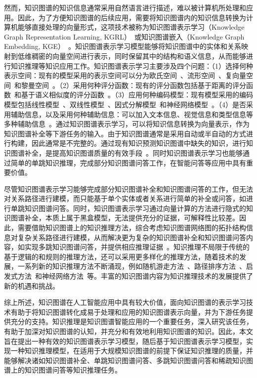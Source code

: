\documentclass[algorithmlist, AutoFakeBold, AutoFakeSlant, figurelist, tablelist, nomlist, engineering]{seuthesix}
\begin{document}
然而，知识图谱的知识信息通常采用自然语言进行描述，难以被计算机所处理和应用。因此，为了方便知识图谱的后续应用，需要将知识图谱内的知识信息转换为计算机能够直接处理的向量形式，这项技术被称为知识图谱表示学习（Knowledge Graph Representation Learning, KGRL）~\cite{chen2022rlpath}或知识图谱嵌入（Knowledge Graph Embedding, KGE）~\cite{wang2021transet}。知识图谱表示学习模型能够将知识图谱中的实体和关系映射到低维稠密的向量空间进行表示，同时保留其中的结构和语义信息，从而能够进行知识推理等知识应用工作。知识图谱表示学习主要涉及四个问题：（1）选择何种表示空间：现有的模型采用的表示空间可以分为欧氏空间~\cite{lu2022dense}、流形空间~\cite{ebisu2018toruse}、复向量空间~\cite{trouillon2016complex}和黎曼空间~\cite{pan2021hyperbolic}。（2）采用何种评分函数：现有的评分函数包括基于距离的评分函数~\cite{sachan2020knowledge}和基于语义相似度的评分函数~\cite{xiao2017ssp}。（3）应用何种编码模型：现有模型采用的编码模型包括线性模型~\cite{peng2020lineare}、双线性模型~\cite{pan2021hyperbolic}、因式分解模型~\cite{ji2015knowledge}和神经网络模型~\cite{jiang2021kernel}。（4）是否采用辅助信息，以及采用何种辅助信息：可以加入文本信息、视觉信息和类型信息等多种辅助信息~\cite{wang2017knowledge}。通过知识图谱表示学习，可以将知识信息转换为向量表示，作为知识图谱补全等下游任务的输入。由于知识图谱通常是采用自动或半自动的方式进行构建，因此通常是不完整的。通过现有知识预测知识图谱中缺失的知识，进行知识图谱补全，是提高知识图谱质量的有效手段~\cite{vu2019capsule}。同时知识图谱表示学习也能够通过简单的单跳知识推理，完成部分知识图谱问答工作，在智能问答等应用中具有重要价值。

尽管知识图谱表示学习能够完成部分知识图谱补全和知识图谱问答的工作，但无法对关系路径进行建模，而只能基于单个实体或者关系进行简单的补全或问答，如进行单跳知识图谱问答。同时，知识图谱表示学习通过向量计算的方法进行隐式的知识图谱补全，本质上属于黑盒模型，无法提供充分的证据，可解释性比较差。因此，需要借助知识图谱上的知识推理方法，综合考虑知识图谱网络图的拓扑结构信息对复杂关系路径进行建模，从而解决更为复杂的知识图谱补全和知识图谱问答内容，如实现多跳知识图谱问答，并提供相应推理证据~\cite{chen2020review}。知识推理不局限于传统的基于逻辑的和规则的推理方法，还可以采用更多样化的推理方法，随着技术的发展，一系列新的知识推理方法不断涌现，例如随机游走方法~\cite{jagvaral2020path}、路径排序方法~\cite{zhao2021target}、启发式方法~\cite{he2021heuristic}和神经网络方法~\cite{wang2018deep}等。丰富的知识图谱内容为知识推理技术的发展提供了新的机遇和挑战。

综上所述，知识图谱在人工智能应用中具有较大价值，面向知识图谱的表示学习技术有助于将知识图谱转化成易于处理和应用的知识图谱表示向量，并为下游任务提供充分的支持。知识推理是知识图谱智能应用的一个重要任务，深入研究该任务，有助于加深对知识图谱的认知，并充分和有效地利用知识图谱的知识。因此，本文旨在提出一种有效的知识图谱表示学习模型，随后基于知识图谱表示学习模型，实现一种知识推理模型，在适用于大规模知识图谱的前提下保证知识推理的质量，并能够解决诸如知识图谱补全、单跳知识图谱问答、多跳知识图谱问答和稀疏知识图谱上的知识图谱问答等知识推理任务。
\end{document}
